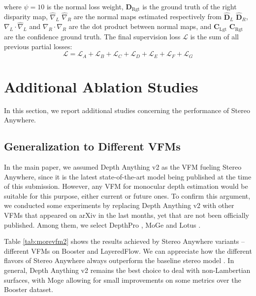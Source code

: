\documentclass[10pt,twocolumn,letterpaper]{article}
\newcommand{\method}[0]{Stereo Anywhere\xspace}
\begin{document}
where $\psi=10$ is the normal loss weight, $\mathbf{D}_\text{Rgt}$ is the ground truth of the right disparity map, $\hat{\nabla}_L$ $\hat{\nabla}_R$ are the normal maps estimated respectively from $\hat{\mathbf{D}}_L$ $\hat{\mathbf{D}}_R$, $\nabla_L\cdot\hat{\nabla}_L$ and $\nabla_R\cdot\hat{\nabla}_R$ are the dot product between normal maps, and $\mathbf{C}_\text{Lgt}$ $\mathbf{C}_\text{Rgt}$ are the confidence ground truth.
The final supervision loss $\mathcal{L}$ is the sum of all previous partial losses:
\small\begin{equation}
    \mathcal{L} = \mathcal{L}_A + \mathcal{L}_B + \mathcal{L}_C + \mathcal{L}_D + \mathcal{L}_E + \mathcal{L}_F + \mathcal{L}_G
    \label{eq:total_loss}
\end{equation}\normalsize

\section{Additional Ablation Studies}
\label{sec:ablation}
In this section, we report additional studies concerning the performance of \method.

\subsection{Generalization to Different VFMs}
\label{subsec:ablation_VFM}

In the main paper, we assumed Depth Anything v2 \cite{depth_anything_v2} as the VFM fueling \method, since it is the latest state-of-the-art model being published at the time of this submission.
However, any VFM for monocular depth estimation would be suitable for this purpose, either current or future ones. To confirm this argument, we conducted some experiments by replacing Depth Anything v2 with other VFMs that appeared on arXiv in the last months, yet that are not been officially published. Among them, we select DepthPro \cite{depthpro}, MoGe \cite{wang2024moge} and Lotus \cite{he2024lotus}.

Table \ref{tab:morevfm2} shows the results achieved by \method variants -- different VFMs on Booster and LayeredFlow. We can appreciate how the different flavors of \method always outperform the baseline stereo model \cite{lipson2021raft}. In general, Depth Anything v2 remains the best choice to deal with non-Lambertian surfaces, with Moge allowing for small improvements on some metrics over the Booster dataset.
\end{document}
